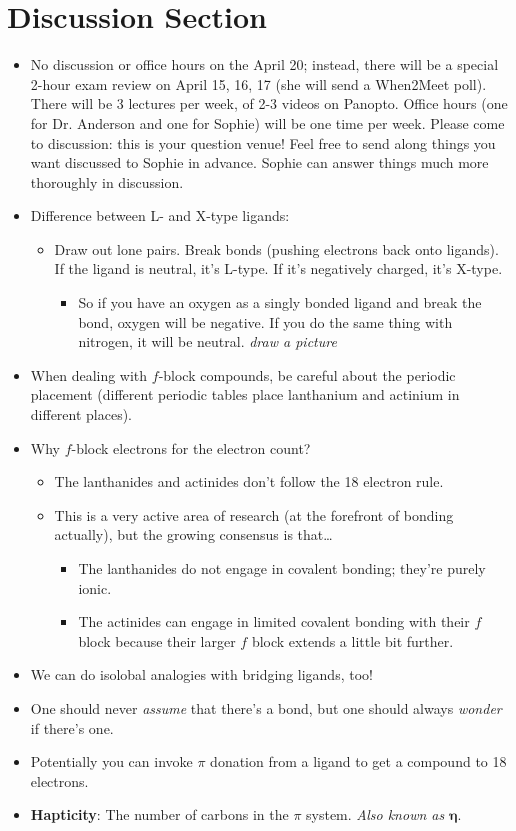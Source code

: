 \documentclass[../notes.tex]{subfiles}
\begin{document}
\section{Discussion Section}
\begin{itemize}
    \item No discussion or office hours on the April 20; instead, there will be a special 2-hour exam review on April 15, 16, 17 (she will send a When2Meet poll). There will be 3 lectures per week, of 2-3 videos on Panopto. Office hours (one for Dr. Anderson and one for Sophie) will be one time per week. Please come to discussion: this is your question venue! Feel free to send along things you want discussed to Sophie in advance. Sophie can answer things much more thoroughly in discussion.
    \item Difference between L- and X-type ligands:
    \begin{itemize}
        \item Draw out lone pairs. Break bonds (pushing electrons back onto ligands). If the ligand is neutral, it's L-type. If it's negatively charged, it's X-type.
        \begin{itemize}
            \item So if you have an oxygen as a singly bonded ligand and break the bond, oxygen will be negative. If you do the same thing with nitrogen, it will be neutral.
            \emph{draw a picture}
        \end{itemize}
    \end{itemize}
    \item When dealing with $f$-block compounds, be careful about the periodic placement (different periodic tables place lanthanium and actinium in different places).
    \item Why $f$-block electrons for the electron count?
    \begin{itemize}
        \item The lanthanides and actinides don't follow the 18 electron rule.
        \item This is a very active area of research (at the forefront of bonding actually), but the growing consensus is that\dots
        \begin{itemize}
            \item The lanthanides do not engage in covalent bonding; they're purely ionic.
            \item The actinides can engage in limited covalent bonding with their $f$ block because their larger $f$ block extends a little bit further.
        \end{itemize}
    \end{itemize}
    \item We can do isolobal analogies with bridging ligands, too!
    \item One should never \emph{assume} that there's a  bond, but one should always \emph{wonder} if there's one.
    \item Potentially you can invoke $\pi$ donation from a ligand to get a compound to 18 electrons.
    \item \textbf{Hapticity}: The number of carbons in the $\pi$ system. \emph{Also known as} $\bm{\eta}$.
\end{itemize}
\end{document}
